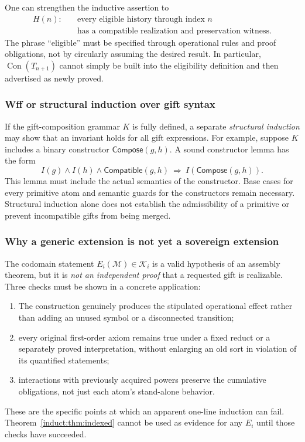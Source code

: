 \documentclass[11pt,letterpaper]{article}
\theoremstyle{definition}\newtheorem{definition}[theorem]{Definition}\newtheorem{example}[theorem]{Example}
\theoremstyle{remark}\newtheorem{remark}[theorem]{Remark}
\newcommand{\Con}{\operatorname{Con}}
\begin{document}
One can strengthen the inductive assertion to
\[
\begin{aligned}
H(n):\quad &\text{every eligible history through index }n\\
&\text{has a compatible realization and preservation witness.}
\end{aligned}
\]
The phrase ``eligible'' must be specified through operational rules and proof obligations, not by circularly assuming the desired result. In particular, \(\Con(T_{n+1})\) cannot simply be built into the eligibility definition and then advertised as newly proved.

\subsubsection{Wff or structural induction over gift syntax}

If the gift-composition grammar \(K\) is fully defined, a separate \emph{structural induction} may show that an invariant holds for all gift expressions. For example, suppose \(K\) includes a binary constructor \(\mathsf{Compose}(g,h)\). A sound constructor lemma has the form
\[
I(g)\wedge I(h)\wedge \mathsf{Compatible}(g,h)
\ \Longrightarrow\ I(\mathsf{Compose}(g,h)).
\]
This lemma must include the actual semantics of the constructor. Base cases for every primitive atom and semantic guards for the constructors remain necessary. Structural induction alone does not establish the admissibility of a primitive or prevent incompatible gifts from being merged.

\subsubsection{Why a generic extension is not yet a sovereign extension}

The codomain statement $E_i(\mathcal M)\in\mathcal K_i$ is a valid hypothesis of an assembly theorem, but it is \emph{not an independent proof} that a requested gift is realizable. Three checks must be shown in a concrete application:
\begin{enumerate}[label=(\alph*)]
\item The construction genuinely produces the stipulated operational effect rather than adding an unused symbol or a disconnected transition;
\item every original first-order axiom remains true under a fixed reduct or a separately proved interpretation, without enlarging an old sort in violation of its quantified statements;
\item interactions with previously acquired powers preserve the cumulative obligations, not just each atom's stand-alone behavior.
\end{enumerate}
These are the specific points at which an apparent one-line induction can fail. Theorem~\ref{induct:thm:indexed} cannot be used as evidence for any $E_i$ until those checks have succeeded.
\end{document}
